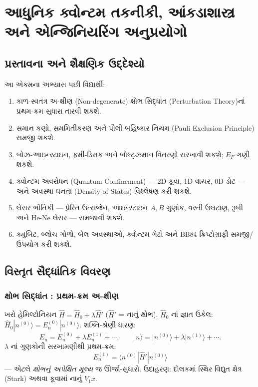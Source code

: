 \chapter[એકમ 5 : આધુનિક તકનીકી અને અનુપ્રયોગો]{આધુનિક ક્વોન્ટમ તકનીકી, આંકડાશાસ્ત્ર અને એન્જિનિયરિંગ અનુપ્રયોગો }

\section{પ્રસ્તાવના અને શૈક્ષણિક ઉદ્દેશ્યો}
\begin{uddeshyo}
આ એકમના અભ્યાસ પછી વિદ્યાર્થી:
\begin{enumerate}[label=\textbf{(\arabic*)}]
  \item કાળ-સ્વતંત્ર અ-ક્ષીણ (Non-degenerate) ક્ષોભ સિદ્ધાંત (Perturbation Theory)નાં પ્રથમ-ક્રમ સુધારા તારવી શકશે.
  \item સમાન કણો, સમમિતીકરણ અને પૌલી બહિષ્કાર નિયમ (Pauli Exclusion Principle) સમજી શકશે.
  \item બોઝ-આઇન્સ્ટાઇન, ફર્મી-ડિરાક અને બોલ્ટ્ઝમાન વિતરણો સરખાવી શકશે; $E_F$ ગણી શકશે.
  \item ક્વોન્ટમ અવરોધન (Quantum Confinement) — 2D કૂવા, 1D વાયર, 0D ડોટ — અને અવસ્થા-ઘનતા (Density of States) વિશ્લેષણ કરી શકશે.
  \item લેસર ભૌતિકી — પ્રેરિત ઉત્સર્જન, આઇન્સ્ટાઇન $A,B$ ગુણાંક, વસ્તી ઉલટાણ, રૂબી અને He-Ne લેસર — સમજાવી શકશે.
  \item ક્યુબિટ, બ્લોચ ગોળો, બેલ અવસ્થાઓ, ક્વોન્ટમ ગેટો અને BB84 ક્રિપ્ટોગ્રાફી સમજી/ઉપયોગ કરી શકશે.
\end{enumerate}
\end{uddeshyo}

\section{વિસ્તૃત સૈદ્ધાંતિક વિવરણ}

\subsection{ક્ષોભ સિદ્ધાંત : પ્રથમ-ક્રમ અ-ક્ષીણ }
ખરો હેમિલ્ટોનિયન $\hat H=\hat H_0+\lambda\hat H'$ ($\hat H'$ = નાનું ક્ષોભ). $\hat H_0$ નાં જ્ઞાત ઉકેલ: $\hat H_0|n^{(0)}\rangle=E_n^{(0)}|n^{(0)}\rangle$. શક્તિ-શ્રેણી ધારણ:
\[
E_n=E_n^{(0)}+\lambda E_n^{(1)}+\cdots,\qquad
|n\rangle=|n^{(0)}\rangle+\lambda|n^{(1)}\rangle+\cdots .
\]
$\lambda$ નાં ગુણકોની સરખામણીથી પ્રથમ-ક્રમ:
\begin{equation}
\boxed{\;E_n^{(1)}=\langle n^{(0)}|\hat H'|n^{(0)}\rangle\;}
\label{eq:perturb}
\end{equation}
— એટલે \emph{ક્ષોભનું અપેક્ષિત મૂલ્ય} જ ઊર્જા-સુધારો. ઉદાહરણ: દોલકમાં સ્થિર વિદ્યુત ક્ષેત્ર (Stark) અથવા કૂવામાં નાનું $V_1x$.

